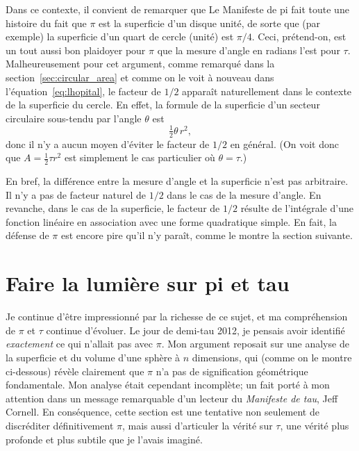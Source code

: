 Dans ce contexte, il convient de remarquer que Le Manifeste de pi fait toute une
histoire du fait que $\pi$ est la superficie d'un disque unité, de sorte que
(par exemple) la superficie d'un quart de cercle (unité) est $\pi/4$. Ceci,
prétend-on, est un tout aussi bon plaidoyer pour $\pi$ que la mesure d'angle en radians l'est pour
$\tau$. Malheureusement pour cet argument, comme remarqué dans la
section~\ref{sec:circular_area} et comme on le voit à nouveau dans
l'équation~\eqref{eq:lhopital}, le facteur de $1/2$ apparaît naturellement dans le
contexte de la superficie du cercle. En effet, la formule de la superficie d'un
secteur circulaire sous-tendu par l'angle $\theta$ est
\[
\tfrac{1}{2}\theta\, r^2,
\]
donc il n'y a aucun moyen d'éviter le facteur de $1/2$ en général. (On voit donc
que $A = \frac{1}{2}\tau r^2$ est simplement le cas particulier où $\theta =
\tau$.)

En bref, la différence entre la mesure d'angle et la superficie n'est pas
arbitraire. \linebreak Il n'y a pas de facteur naturel de $1/2$ dans le cas de
la mesure d'angle. En revanche, dans le cas de la superficie, le facteur de $1/2$
résulte de l'intégrale d'une fonction linéaire en association avec une forme
quadratique simple. En fait, la défense de $\pi$ est encore pire qu'il n'y paraît,
comme le montre la section suivante.


\section{Faire la lumière sur pi et tau} %
\label{sec:getting_to_the_bottom_of_pi}

Je continue d'être impressionné par la richesse de ce sujet, et ma compréhension
de $\pi$ et $\tau$ continue d'évoluer. Le jour de demi-tau 2012, je pensais
avoir identifié \emph{exactement} ce qui n'allait pas avec $\pi$. Mon argument
reposait sur une analyse de la superficie et du volume d'une sphère à $n$
dimensions, qui (comme on le montre ci-dessous) révèle clairement que $\pi$ n'a pas
de signification géométrique fondamentale. Mon analyse était cependant
incomplète\ns; un fait porté à mon attention dans un message remarquable d'un
lecteur du \emph{Manifeste de tau}, Jeff Cornell. En conséquence, cette section
est une tentative non seulement de discréditer définitivement $\pi$, mais aussi
d'articuler la vérité sur $\tau$, une vérité plus profonde et plus subtile que
je l'avais imaginé.

